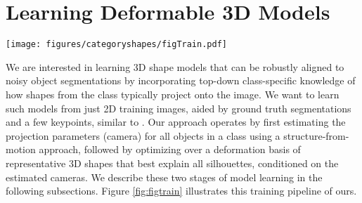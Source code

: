 \section{Learning Deformable 3D Models}

\begin{figure*}[htb!]
\texttt{[image: figures/categoryshapes/figTrain.pdf]}
\caption{Overview of our training pipeline. We use an annotated image collection to estimate camera projection parameters which we then use along with object silhouettes to learn 3D shape models. Our learnt shape models, as illustrated in the rightmost figure are capable of deforming to capture intra-class shape variation.}
\label{fig:figtrain}
\end{figure*}

We are interested in learning 3D shape models that can be robustly aligned to noisy object segmentations by incorporating top-down class-specific knowledge of how shapes from the class typically project onto the image. We want to learn such models from just 2D training images, aided by ground truth segmentations and a few keypoints, similar to \cite{carvi14}. Our approach operates by first estimating the projection parameters (camera) for all objects in a class using a structure-from-motion approach, followed by optimizing over a deformation basis of representative 3D shapes that best explain all silhouettes, conditioned on the estimated cameras. We describe these two stages of model learning in the following subsections. Figure \ref{fig:figtrain} illustrates this training pipeline of ours.




